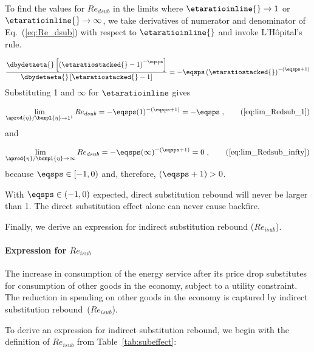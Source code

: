 To find the values for $Re_{dsub}$ in the limits where $\etaratioinline{} \to 1$ or 
$\etaratioinline{} \to \infty$, we take derivatives of numerator and denominator
of Eq.~(\ref{eq:Re_dsub}) with respect to $\etaratioinline{}$ and invoke L'H\^{o}pital's rule.

\begin{equation}
  \frac{\dbydetaeta{}\left[ \left( \etaratiostacked{} - 1 \right)^{-\eqsps}  \right]}
           {\dbydetaeta{}\left[ \etaratiostacked{} - 1\right]}
    = -\eqsps \left( \etaratiostacked{} \right)^{-(\eqsps + 1)}
\end{equation}
%
Substituting 1 and $\infty$ for $\etaratioinline$ gives

\begin{equation}
  \lim_{\aprod{\eta}/\bempl{\eta} \to 1^{\!+}} Re_{dsub} 
    = -\eqsps ( 1 )^{-(\eqsps + 1)}
    = -\eqsps \; ,                               \tag{\ref{eq:lim_Redsub_1}}
\end{equation}
%
and

\begin{equation}
  \lim_{\aprod{\eta}/\bempl{\eta} \to \infty} Re_{dsub} 
    = -\eqsps ( \infty )^{-(\eqsps + 1)}
    = 0 \; ,                                              \tag{\ref{eq:lim_Redsub_infty}}
\end{equation}
%
because $\eqsps \in [-1, 0)$ and, therefore, $(\eqsps + 1) > 0$.

With $\eqsps \in (-1, 0)$ expected,
direct substitution rebound will never be larger than 1.
The direct substitution effect alone
can never cause backfire. 

Finally, we derive an expression for indirect substitution rebound ($Re_{isub}$).


\paragraph{Expression for $Re_{isub}$}
\label{sec:Re_isub}

The increase in consumption of the energy service after its price drop
substitutes for consumption of other goods in the economy,
subject to a utility constraint.
The reduction in spending on other goods in the economy
is captured by indirect substitution rebound~($Re_{isub}$).

To derive an expression for indirect substitution rebound,
we begin with the definition of $Re_{isub}$
from Table~\ref{tab:subeffect}:

